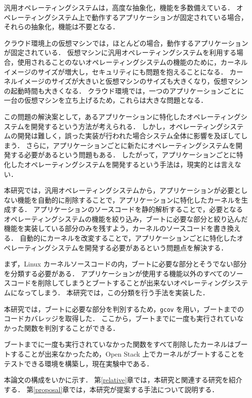 \documentclass[graduation-thesis]{mlarticle}
\begin{document}
汎用オペレーティングシステムは，高度な抽象化，機能を多数備えている．
オペレーティングシステム上で動作するアプリケーションが固定されている場合，それらの抽象化，機能は不要となる．

クラウド環境上の仮想マシンでは，ほとんどの場合，動作するアプリケーションが固定されている．
仮想マシンに汎用オペレーティングシステムを利用する場合，使用されることのないオペレーティングシステムの機能のために，カーネルイメージのサイズが増大し，セキュリティにも問題を抱えることになる． 
カーネルイメージのサイズが大きいと仮想マシンのサイズも大きくなり，仮想マシンの起動時間も大きくなる．
クラウド環境では，一つのアプリケーションごとに一台の仮想マシンを立ち上げるため，これらは大きな問題となる．

この問題の解決案として，あるアプリケーションに特化したオペレーティングシステムを開発するという方法が考えられる．
しかし，オペレーティングシステムの開発は難しく，誤った実装が行われた場合システム全体に影響を及ぼしてしまう．
さらに，アプリケーションごとに新たにオペレーティングシステムを開発する必要があるという問題もある．
したがって，アプリケーションごとに特化したオペレーティングシステムを開発するという手法は，現実的とは言えない．


本研究では，汎用オペレーティングシステムから，アプリケーションが必要としない機能を自動的に削除することで，アプリケーションに特化したカーネルを生成する．
アプリケーションのソースコードを静的解析することで，必要となるオペレーティングシステムの機能を絞り込み，ブートに必要な部分と絞り込んだ機能を実装している部分のみを残すよう，カーネルのソースコードを書き換える．
自動的にカーネルを改変することで，アプリケーションごとに特化したオペレーティングシステムを開発する必要があるという問題点を解決する．

まず，Linux カーネルソースコードの内，ブートに必要な部分とそうでない部分を分類する必要がある．
アプリケーションが使用する機能以外のすべてのソースコードを削除してしまうとブートすることが出来ないオペレーティングシステムになってしまう．
本研究では，この分類を行う手法を実装した．

本研究では，ブートに必要な部分を判別するため，\texttt{gcov} を用い，ブートまでのコードカバレッジを取得した．
ここから，ブートまでに一度も実行されていなかった関数を判別することができる．

ブートまでに一度も実行されていなかった関数をすべて削除したカーネルはブートすることが出来なかったため，Open Stack 上でカーネルがブートすることをテストできる環境を構築し，現在実験中である．

本論文の構成をいかに示す．
第\ref{relative}章では，本研究と関連する研究を紹介する．
第\ref{proposal}章では，本研究が提案する手法について説明する．
\end{document}
